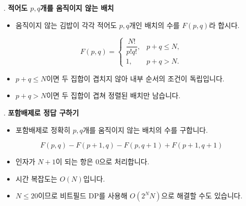 \begin{frame}{\textbf{\pletter}. \ptitle}
    \textbf{적어도 $p,q$개를 움직이지 않는 배치}
    \begin{itemize}
        \item 움직이지 않는 김밥이 각각 적어도 $p,q$개인 배치의 수를 $F(p,q)$라 합시다.
    \end{itemize}
    \[
        F(p,q)=
        \begin{cases}
            \dfrac{N!}{p!q!},&p+q\le N,\\[4pt]
            1,&p+q>N.
        \end{cases}
    \]
    \begin{itemize}
        \item $p+q\le N$이면 두 집합이 겹치지 않아 내부 순서의 조건이 독립입니다.
        \item $p+q>N$이면 두 집합이 겹쳐 정렬된 배치만 남습니다.
    \end{itemize}
\end{frame}

\begin{frame}{\textbf{\pletter}. \ptitle}
    \textbf{포함배제로 정답 구하기}
    \begin{itemize}
        \item 포함배제로 정확히 $p,q$개를 움직이지 않는 배치의 수를 구합니다.
    \end{itemize}
    \[
        \boxed{F(p,q)-F(p+1,q)-F(p,q+1)+F(p+1,q+1)}
    \]
    \begin{itemize}
        \item 인자가 $N+1$이 되는 항은 $0$으로 처리합니다.
        \item 시간 복잡도는 $O(N)$입니다.
        \item $N\le20$이므로 비트필드 DP를 사용해 $O(2^N N)$으로 해결할 수도 있습니다.
    \end{itemize}
\end{frame}
